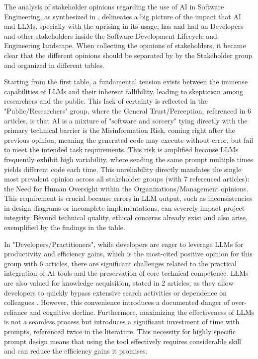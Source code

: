 The analysis of stakeholder opinions regarding the use of AI in Software Engineering, as synthesized in , delineates a big picture of the impact that AI and LLMs, specially with the uprising in its usage, has and had on Developers and other stakeholders inside the Software Development Lifecycle and Engineering landscape. When collecting the opinions of stakeholders, it became clear that the different opinions should be separated by by the Stakeholder group and organized in different tables. 

Starting from the first table, a fundamental tension exists between the immense capabilities of LLMs and their inherent fallibility, leading to skepticism among researchers and the public. This lack of certainty is reflected in the "Public/Researchers" group, where the General Trust/Perception, referenced in 6 articles, is that AI is a mixture of "software and sorcery" tying directly with the  primary technical barrier is the Misinformation Risk, coming right after the previous opinion, meaning the generated code may execute without error, but fail to meet the intended task requirements. This risk is amplified because LLMs frequently exhibit high variability, where sending the same prompt multiple times yields different code each time. This unreliability directly mandates the single most prevalent opinion across all stakeholder groups (with 7 referenced articles): the Need for Human Oversight within the Organizations/Management opinions. This requirement is crucial because errors in LLM output, such as inconsistencies in design diagrams or incomplete implementations, can severely impact project integrity. Beyond technical quality, ethical concerns already exist and also arise, exemplified by the findings in the table.

In "Developers/Practitioners", while developers are eager to leverage LLMs for productivity and efficiency gains, which is the most-cited positive opinion for this group with 6 articles, there are significant challenges related to the practical integration of AI tools and the preservation of core technical competence. LLMs are also valued for knowledge acquisition, stated in 2 articles, as they allow developers to quickly bypass extensive search activities or dependence on colleagues \cite{Banh:2025cf}. However, this convenience introduces a documented danger of over-reliance and cognitive decline. Furthermore, maximizing the effectiveness of LLMs is not a seamless process but introduces a significant investment of time with prompts, referenced twice in the literature\cite{Banh:2025cf}. This necessity for highly specific prompt design means that using the tool effectively requires considerable skill and can reduce the efficiency gains it promises. 

